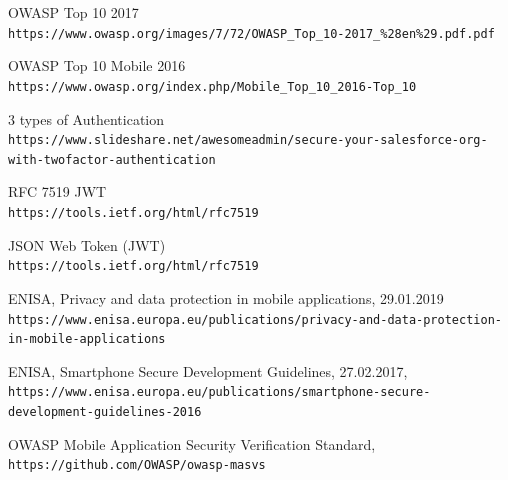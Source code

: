 \documentclass[a4paper]{article}
\begin{document}
\begin{thebibliography}{9}

    OWASP Top 10 2017
    \\\texttt{https://www.owasp.org/images/7/72/OWASP\_Top\_10-2017\_\%28en\%29.pdf.pdf}

    OWASP Top 10 Mobile 2016 
    \\\texttt{https://www.owasp.org/index.php/Mobile\_Top\_10\_2016-Top\_10}

    3 types of Authentication
    \\\texttt{https://www.slideshare.net/awesomeadmin/secure-your-salesforce-org-with-twofactor-authentication}
    
    RFC 7519 JWT
    \\\texttt{https://tools.ietf.org/html/rfc7519}

    JSON Web Token (JWT)
    \\\texttt{https://tools.ietf.org/html/rfc7519}

    ENISA,
    Privacy and data protection in mobile applications, 29.01.2019
    \\\texttt{https://www.enisa.europa.eu/publications/privacy-and-data-protection-in-mobile-applications}

    ENISA,
    Smartphone Secure Development Guidelines, 27.02.2017,
    \\\texttt{https://www.enisa.europa.eu/publications/smartphone-secure-development-guidelines-2016}

    OWASP Mobile Application Security Verification Standard,
    \\\texttt{https://github.com/OWASP/owasp-masvs}


\end{thebibliography}   
\end{document}
